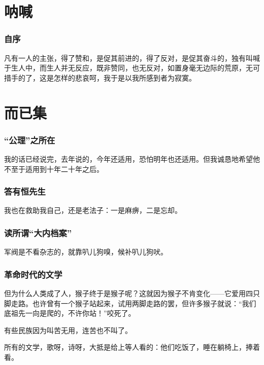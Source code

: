 \documentclass[a4paper]{ctexart}
\begin{document}
    \begin{sloppy}
		\part{呐喊}
		\section{
			自序		
		} {
            \setlength{\parindent}{2em}
            
			凡有一人的主张，得了赞和，是促其前进的，得了反对，是促其奋斗的，独有叫喊于生人中，而生人并无反应，既非赞同，也无反对，如置身毫无边际的荒原，无可措手的了，这是怎样的悲哀呵，我于是以我所感到者为寂寞。
		}
		
	
        \part{而已集}
        \section{
            “公理”之所在
        } {
            \setlength{\parindent}{2em}
            我的话已经说完，去年说的，今年还适用，恐怕明年也还适用。但我诚恳地希望他不至于适用到十年二十年之后。
        }

        \section{
            答有恒先生
        }
        我也在救助我自己，还是老法子：一是麻痹，二是忘却。

        \section{
            读所谓“大内档案”
        }

        军阀是不看杂志的，就靠叭儿狗嗅，候补叭儿狗吠。

        \section{
            革命时代的文学
        }
        但为什么人类成了人，猴子终于是猴子呢？这就因为猴子不肯变化——它爱用四只脚走路。也许曾有一个猴子站起来，试用两脚走路的罢，但许多猴子就说：“我们底祖先一向是爬的，不许你站！”咬死了。

        有些民族因为叫苦无用，连苦也不叫了。

        所有的文学，歌呀，诗呀，大抵是给上等人看的：他们吃饭了，睡在躺椅上，捧着看。


\end{sloppy}
\end{document}
